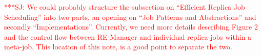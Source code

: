 \documentclass{rspublic}
\newcommand{\jhanote}[1]{ {\textcolor{red} { ***SJ: #1 }}}
\newcommand{\jhanote}[1]{}
\newcommand{\remanager}[1]{RE-Manager }
\begin{document}
\jhanote{We could probably structure the subsection on ``Efficient
  Replica Job Scheduling'' into two parts, an opening on ``Job
  Patterns and Abstractions'' and secondly
  ``Implementations''. Currently, we need more details describing
  Figure 2 and the control flow between \remanager\ and individual
  replica-jobs within a meta-job. This location of this note, is a
  good point to separate the two.}    





\end{document}
